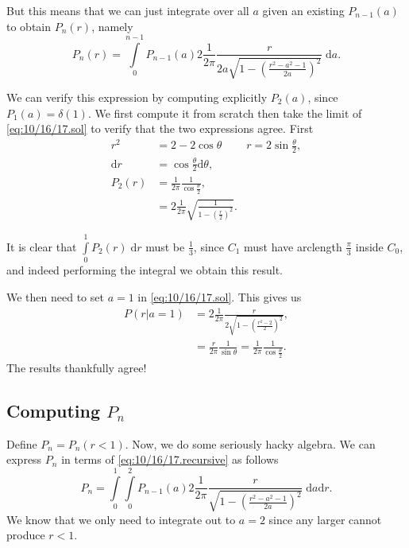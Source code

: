 \documentclass[12pt]{report}
\begin{document}
But this means that we can just integrate over all $a$ given an existing
$P_{n-1}(a)$ to obtain $P_n(r)$, namely
\begin{equation}
    P_n(r) = \int\limits_{0}^{n - 1}
        P_{n - 1}(a) 2\frac{1}{2\pi}\frac{r}{2a\sqrt{1 - \left(
            \frac{r^2 - a^2 - 1}{2a}
        \right)^2}}\;\mathrm{d}a.
        \label{eq:10/16/17.recursive}
\end{equation}

We can verify this expression by computing explicitly $P_2(a)$, since $P_1(a) =
\delta(1)$. We first compute it from scratch then take the limit of
\autoref{eq:10/16/17.sol} to verify that the two expressions agree. First
\begin{align}
    r^2 &= 2 - 2\cos \theta & r = 2\sin\frac{\theta}{2},\\
    \mathrm{d}r &= \cos \frac{\theta}{2}\mathrm{d}\theta,\\
    P_2(r) &= \frac{1}{2\pi} \frac{1}{\cos \frac{\theta}{2}},\nonumber\\
        &= 2\frac{1}{2\pi}\sqrt{\frac{1}{1 - \left( \frac{r}{2} \right)^2}}.
\end{align}

It is clear that $\int\limits_{0}^{1}P_2(r)\;\mathrm{d}r$ must be $\frac{1}{3}$,
since $C_1$ must have arclength $\frac{\pi}{3}$ inside $C_0$, and indeed
performing the integral we obtain this result.

We then need to set $a = 1$ in \autoref{eq:10/16/17.sol}. This gives us
\begin{align}
    P(r|a = 1) &= 2\frac{1}{2\pi}\frac{r}{2\sqrt{1 - \left(
        \frac{r^2 - 2}{2}
    \right)^2}},\nonumber\\
        &= \frac{r}{2\pi} \frac{1}{\sin\theta} = \frac{1}{2\pi}\frac{1}{\cos
        \frac{\theta}{2}}.
\end{align}
The results thankfully agree!

\subsection{Computing $P_n$}

Define $P_n = P_n(r < 1)$. Now, we do some seriously hacky algebra. We can
express $P_n$ in terms of \autoref{eq:10/16/17.recursive} as follows
\begin{equation}
    P_n = \int\limits_{0}^{1}\int\limits_{0}^{2}P_{n - 1}(a)
        2\frac{1}{2\pi} \frac{r}{\sqrt{1 - \left( \frac{r^2 - a^2 - 1}{2a}
        \right)^2}}\;\mathrm{d}a\mathrm{d}r.
\end{equation}
We know that we only need to integrate out to $a = 2$ since any larger cannot
produce $r < 1$.
\end{document}
